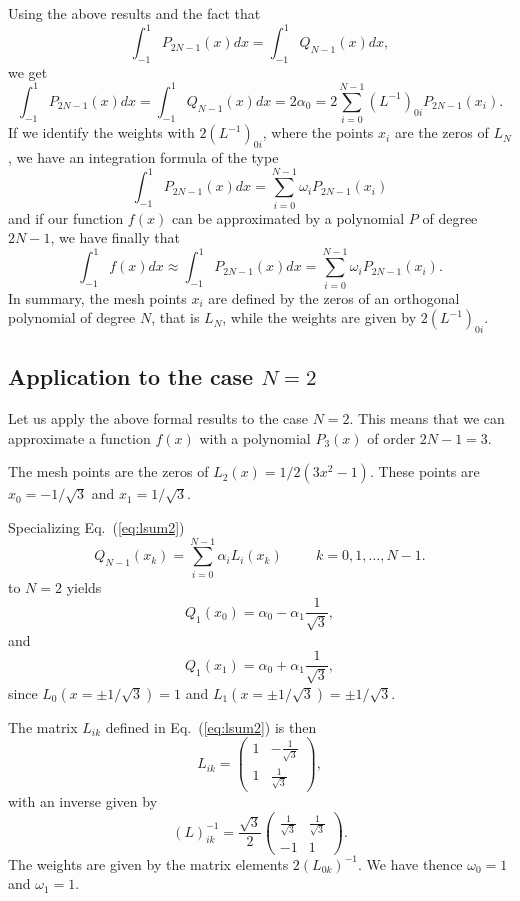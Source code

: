 Using the above results and the fact that
\[ 
   \int_{-1}^1P_{2N-1}(x)dx=\int_{-1}^1Q_{N-1}(x)dx,
\]
we get 
\[ 
   \int_{-1}^1P_{2N-1}(x)dx=\int_{-1}^1Q_{N-1}(x)dx=2\alpha_0=
   2\sum_{i=0}^{N-1}(L^{-1})_{0i}P_{2N-1}(x_i).
\]
If we identify the weights with $2(L^{-1})_{0i}$, where the points $x_i$ are
the zeros of $L_N$, we have an integration formula of the type 
\[
   \int_{-1}^1P_{2N-1}(x)dx=\sum_{i=0}^{N-1}\omega_iP_{2N-1}(x_i)  
\]
and if our function $f(x)$  can be approximated by a polynomial $P$ of degree
$2N-1$, we have finally that 
\[
    \int_{-1}^1f(x)dx\approx \int_{-1}^1P_{2N-1}(x)dx=\sum_{i=0}^{N-1}\omega_iP_{2N-1}(x_i)  .
\]
In summary, the mesh points $x_i$ are defined by the zeros of an orthogonal polynomial of degree $N$, that is 
$L_N$, while the weights are
given by $2(L^{-1})_{0i}$. 


\subsection{Application to the case $N=2$}

Let us apply the above formal results to the case $N=2$. 
This means that we can approximate a function $f(x)$ with a
polynomial $P_3(x)$ of order $2N-1=3$. 

The mesh points are the zeros of $L_2(x)=1/2(3x^2-1)$. 
These points are $x_0=-1/\sqrt{3}$ and $x_1=1/\sqrt{3}$.

Specializing Eq.~(\ref{eq:lsum2}) 
\[ 
  Q_{N-1}(x_k)=\sum_{i=0}^{N-1}\alpha_iL_i(x_k) \hspace{1cm} k=0,1,\dots, N-1.
\]
to $N=2$ yields  
\[
   Q_1(x_0)=\alpha_0-\alpha_1\frac{1}{\sqrt{3}},
\]
and 
\[
   Q_1(x_1)=\alpha_0+\alpha_1\frac{1}{\sqrt{3}},
\]
since $L_0(x=\pm 1/\sqrt{3})=1$ and $L_1(x=\pm 1/\sqrt{3})=\pm 1/\sqrt{3}$. 

The matrix $L_{ik}$ defined in Eq.~(\ref{eq:lsum2}) is then
\[
   L_{ik}=\left(\begin{array} {cc} 1  & -\frac{1}{\sqrt{3}}\\
                                   1  & \frac{1}{\sqrt{3}}\end{array}\right),
\]
with an inverse given by
\[
   (L)_{ik}^{-1}=\frac{\sqrt{3}}{2}\left(\begin{array} {cc} \frac{1}{\sqrt{3}}  & \frac{1}{\sqrt{3}}\\
                                   -1  & 1\end{array}\right).
\]
The weights are given by the matrix elements $2(L_{0k})^{-1}$. We have thence
$\omega_0=1$ and $\omega_1=1$. 

